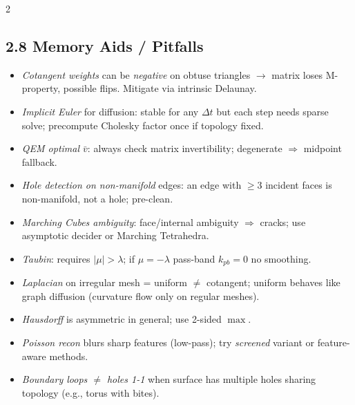 \begin{paracol}{2}
\subsection*{2.8 Memory Aids / Pitfalls}
\begin{itemize}[leftmargin=*,nosep]
  \item \emph{Cotangent weights} can be \emph{negative} on obtuse triangles $\to$ matrix loses M-property, possible flips. Mitigate via intrinsic Delaunay.
  \item \emph{Implicit Euler} for diffusion: stable for any $\Delta t$ but each step needs sparse solve; precompute Cholesky factor once if topology fixed.
  \item \emph{QEM optimal $\bar v$}: always check matrix invertibility; degenerate $\Rightarrow$ midpoint fallback.
  \item \emph{Hole detection on non-manifold} edges: an edge with $\ge 3$ incident faces is non-manifold, not a hole; pre-clean.
  \item \emph{Marching Cubes ambiguity}: face/internal ambiguity $\Rightarrow$ cracks; use asymptotic decider or Marching Tetrahedra.
  \item \emph{Taubin}: requires $|\mu|>\lambda$; if $\mu=-\lambda$ pass-band $k_{pb}=0$ no smoothing.
  \item \emph{Laplacian} on irregular mesh = uniform $\ne$ cotangent; uniform behaves like graph diffusion (curvature flow only on regular meshes).
  \item \emph{Hausdorff} is asymmetric in general; use 2-sided $\max$.
  \item \emph{Poisson recon} blurs sharp features (low-pass); try \emph{screened} variant or feature-aware methods.
  \item \emph{Boundary loops $\ne$ holes 1-1} when surface has multiple holes sharing topology (e.g., torus with bites).
\end{itemize}

\switchcolumn


\end{paracol}

